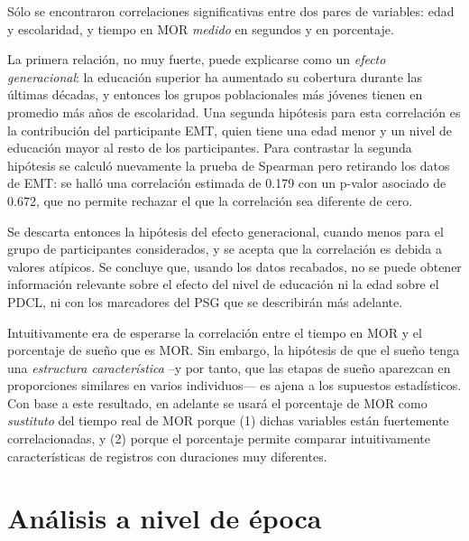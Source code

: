 \documentclass[12pt,letterpaper]{book}
\begin{document}
Sólo se encontraron correlaciones significativas entre dos pares de variables: edad y escolaridad, y tiempo en MOR \textit{medido} en segundos y en porcentaje.

La primera relación, no muy fuerte, puede explicarse como un \textit{efecto generacional}: la educación superior ha aumentado su cobertura durante las últimas décadas, y entonces los grupos poblacionales más jóvenes tienen en promedio más años de escolaridad. 
%
%
Una segunda hipótesis para esta correlación es la contribución del participante EMT, quien tiene una edad menor y un nivel de educación mayor al resto de los participantes.
%
Para contrastar la segunda hipótesis se calculó nuevamente la prueba de Spearman pero retirando los datos de EMT: se halló una correlación estimada de 0.179 con un p-valor asociado de 0.672, que no permite rechazar el que la correlación sea diferente de cero.

Se descarta entonces la hipótesis del efecto generacional, cuando menos para el grupo de participantes considerados, y se acepta que la correlación es debida a valores atípicos. Se concluye que, usando los datos recabados, no se puede obtener información relevante sobre el efecto del nivel de educación ni la edad sobre el PDCL, ni con los marcadores del PSG que se describirán más adelante.

Intuitivamente era de esperarse la correlación entre el tiempo en MOR y el porcentaje de sueño que es MOR.
%
Sin embargo, la hipótesis de que el sueño tenga una \textit{estructura característica} --y por tanto, que las etapas de sueño aparezcan en proporciones similares en varios individuos--- es ajena a los supuestos estadísticos.
%
Con base a este resultado, en adelante se usará el porcentaje de MOR como \textit{sustituto} del tiempo real de MOR porque (1) dichas variables están fuertemente correlacionadas, y (2) porque el porcentaje permite comparar intuitivamente características de registros con duraciones muy diferentes.


\section{Análisis a nivel de época}
\label{sec:analisis_epoca}
\end{document}
